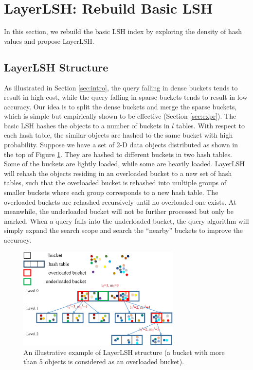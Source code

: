 \section{LayerLSH: Rebuild Basic LSH}
\label{sec:reclsh}

In this section, we rebuild the basic LSH index \cite{datar,Gionis:1999:SSH:645925.671516} by exploring the density of hash values and propose LayerLSH.


\subsection{LayerLSH Structure}
\label{sec:layerlsh:overview}

As illustrated in Section \ref{sec:intro}, the query falling in dense buckets tends to result in high cost, while the query falling in sparse buckets tends to result in low accuracy. Our idea is to split the dense buckets and merge the sparse buckets, which is simple but empirically shown to be effective (Section \ref{sec:expr}). The basic LSH hashes the objects to a number of buckets in $l$ tables. With respect to each hash table, the similar objects are hashed to the same bucket with high probability. Suppose we have a set of 2-D data objects distributed as shown in the top of Figure \ref{fig:overview}. They are hashed to different buckets in two hash tables. Some of the buckets are lightly loaded, while some are heavily loaded. LayerLSH will rehash the objects residing in an overloaded bucket to a new set of hash tables, such that the overloaded bucket is rehashed into multiple groups of smaller buckets where each group corresponds to a new hash table. The overloaded buckets are rehashed recursively until no overloaded one exists. At meanwhile, the underloaded bucket will not be further processed but only be marked. When a query falls into the underloaded bucket, the query algorithm will simply expand the search scope and search the ``nearby'' buckets to improve the accuracy.

\begin{figure}[t]
\vspace{-0.1in}
    \centerline{\includegraphics[width=3.2in]{fig/overview.eps}}
     \vspace{-0.05in}
    \caption{An illustrative example of LayerLSH structure (a bucket with more than 5 objects is considered as an overloaded bucket).}
    \label{fig:overview}
    \vspace{-0.2in}
\end{figure}


